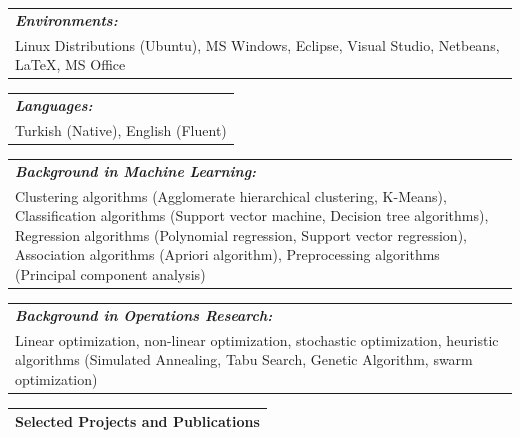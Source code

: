 \documentclass[11pt]{article}
\newcommand{\bigspace}{\vspace{0.4cm}}
\begin{document}
\begin{tabular}{p{18cm}}
\textit{\textbf{Environments:}} \\
Linux Distributions (Ubuntu), MS Windows, Eclipse, Visual Studio, Netbeans, \LaTeX, MS Office
\end{tabular}

\bigspace

\begin{tabular}{p{18cm}}
\textit{\textbf{Languages:}}\\
Turkish (Native), English (Fluent)
\end{tabular}

\bigspace

\begin{tabular}{p{18cm}}
\textit{\textbf{Background in Machine Learning:}}\\
Clustering algorithms (Agglomerate hierarchical clustering, K-Means), Classification algorithms (Support vector machine, Decision tree algorithms), Regression algorithms (Polynomial regression, Support vector regression), Association algorithms (Apriori algorithm), Preprocessing algorithms (Principal component analysis)
\end{tabular}


\begin{tabular}{p{18cm}}
\textit{\textbf{Background in Operations Research:}}\\
Linear optimization, non-linear optimization, stochastic optimization, heuristic algorithms (Simulated Annealing, Tabu Search, Genetic Algorithm, swarm optimization)
\end{tabular}

\bigspace
\begin{tabular}{p{18cm}}
\textbf{Selected Projects and Publications} \\
\hline
\end{tabular}
\end{document}
